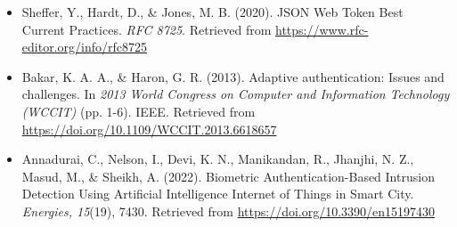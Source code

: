 \begin{itemize}[label={}]
    \item Sheffer, Y., Hardt, D., \& Jones, M. B. (2020). JSON Web Token Best Current Practices. \textit{RFC 8725}. Retrieved from \url{https://www.rfc-editor.org/info/rfc8725}
        
    \item Bakar, K. A. A., \& Haron, G. R. (2013). Adaptive authentication: Issues and challenges. In \textit{2013 World Congress on Computer and Information Technology (WCCIT)} (pp. 1-6). IEEE. Retrieved from \url{https://doi.org/10.1109/WCCIT.2013.6618657}
    
    \item Annadurai, C., Nelson, I., Devi, K. N., Manikandan, R., Jhanjhi, N. Z., Masud, M., \& Sheikh, A. (2022). Biometric Authentication-Based Intrusion Detection Using Artificial Intelligence Internet of Things in Smart City. \textit{Energies, 15}(19), 7430. Retrieved from \url{https://doi.org/10.3390/en15197430}
\end{itemize}